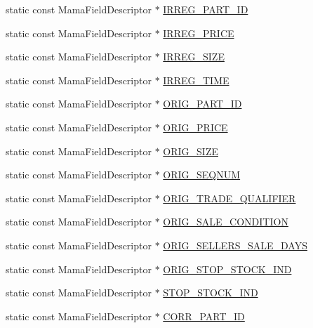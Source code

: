 \begin{CompactItemize}
\item 
static const Mama\-Field\-Descriptor $\ast$ \hyperlink{classWombat_1_1MamdaTradeFields_2ec6d44872ab573e246e9ad76d0571e0}{IRREG\_\-PART\_\-ID}
\item 
static const Mama\-Field\-Descriptor $\ast$ \hyperlink{classWombat_1_1MamdaTradeFields_34dd9267e45f5e42e3dd742d643ac277}{IRREG\_\-PRICE}
\item 
static const Mama\-Field\-Descriptor $\ast$ \hyperlink{classWombat_1_1MamdaTradeFields_8f3e4b7246b09ecd6eb5c0c182163731}{IRREG\_\-SIZE}
\item 
static const Mama\-Field\-Descriptor $\ast$ \hyperlink{classWombat_1_1MamdaTradeFields_814a54aa0564be977dece5911c3c5526}{IRREG\_\-TIME}
\item 
static const Mama\-Field\-Descriptor $\ast$ \hyperlink{classWombat_1_1MamdaTradeFields_32ebc5f94be402c21581d972d71fe2cb}{ORIG\_\-PART\_\-ID}
\item 
static const Mama\-Field\-Descriptor $\ast$ \hyperlink{classWombat_1_1MamdaTradeFields_df954e60aface17e3855a745568e75e8}{ORIG\_\-PRICE}
\item 
static const Mama\-Field\-Descriptor $\ast$ \hyperlink{classWombat_1_1MamdaTradeFields_7b887c2ba4c6928a759632935c3997ac}{ORIG\_\-SIZE}
\item 
static const Mama\-Field\-Descriptor $\ast$ \hyperlink{classWombat_1_1MamdaTradeFields_0dbe02df598d6a126ee49c5aaa8a05a4}{ORIG\_\-SEQNUM}
\item 
static const Mama\-Field\-Descriptor $\ast$ \hyperlink{classWombat_1_1MamdaTradeFields_58662eb4c1d3561e04712a70e95eac48}{ORIG\_\-TRADE\_\-QUALIFIER}
\item 
static const Mama\-Field\-Descriptor $\ast$ \hyperlink{classWombat_1_1MamdaTradeFields_34ced09149ed0b1d8eb74c7c8a895393}{ORIG\_\-SALE\_\-CONDITION}
\item 
static const Mama\-Field\-Descriptor $\ast$ \hyperlink{classWombat_1_1MamdaTradeFields_16b62103586d1e6ea3973e0aa397a00d}{ORIG\_\-SELLERS\_\-SALE\_\-DAYS}
\item 
static const Mama\-Field\-Descriptor $\ast$ \hyperlink{classWombat_1_1MamdaTradeFields_a6e1f19a93c90ff95093e90177deb9c7}{ORIG\_\-STOP\_\-STOCK\_\-IND}
\item 
static const Mama\-Field\-Descriptor $\ast$ \hyperlink{classWombat_1_1MamdaTradeFields_ef1ba4de27357d660131b2b6c98e8331}{STOP\_\-STOCK\_\-IND}
\item 
static const Mama\-Field\-Descriptor $\ast$ \hyperlink{classWombat_1_1MamdaTradeFields_a0f007e26e35f4dd3ccdd689ade185dd}{CORR\_\-PART\_\-ID}

\end{CompactItemize}
